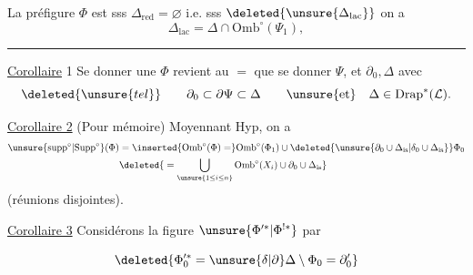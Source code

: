 La préfigure $\Phi$ est  sss $\Delta_{\mathrm{red}}=\varnothing$ i.e. sss $\deleted{\unsure{\Delta_{\mathrm{lac}}}}$ on a
\[
\Delta_{\mathrm{lac}}=\Delta\cap\mathrm{Omb}^{\circ}(\Psi_1),
\]

\noindent\begin{minipage}{.025\linewidth}\rule{.5pt}{4\baselineskip}\end{minipage}\begin{minipage}{.95\linewidth}
\uline{Corollaire} 1 Se donner une  $\Phi$  revient au $=$ que se donner $\Psi$, et $\partial_0,\Delta$ avec
\[
\deleted{\unsure{tel}}\qquad\partial_0\subset\partial\Psi\subset\Delta\qquad\unsure{\text{et}}\quad\Delta\in\mathrm{Drap}^{*}(\mathcal{L}).
\]
\end{minipage}

\uline{Corollaire 2} (Pour mémoire) Moyennant Hyp,  on a
\[
\begin{aligned}
\unsure{\mathrm{supp}^{\circ}|\mathrm{Supp}^{\circ}}(\Phi)&=\inserted{\mathrm{Omb}^{\circ}(\Phi)=}\mathrm{Omb}^{\circ}(\Phi_1)\cup\deleted{\unsure{\partial_0\cup\Delta_{\mathrm{is}}|\delta_0\cup\Delta_{\mathrm{is}}}}\Phi_0\\
&\deleted{{}=\bigcup_{\unsure{1\leq i\leq n}}\mathrm{Omb}^{\circ}(X_i)\cup\partial_0\cup\Delta_{\mathrm{is}}}
\end{aligned}
\]
(réunions disjointes).

\uline{Corollaire 3} Considérons la figure $\unsure{\Phi^{\prime *}|\Phi^{!*}}$  par

\[
\deleted{\Phi_0^{\prime *}=\unsure{\delta|\partial}\Delta\setminus\Phi_0=\partial'_0}
\]

